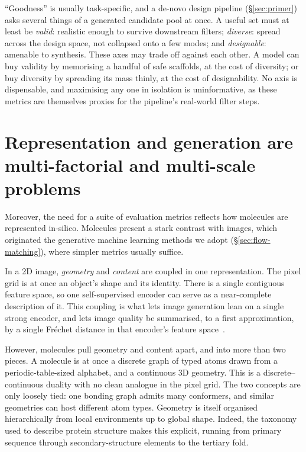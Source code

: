 \documentclass[12pt,a4paper,twoside]{report}
\begin{document}
``Goodness'' is usually task-specific, and a de-novo design pipeline (\S\ref{sec:primer}) asks several things of a generated candidate pool at once. A useful set must at least be \emph{valid}: realistic enough to survive downstream filters; \emph{diverse}: spread across the design space, not collapsed onto a few modes; and \emph{designable}: amenable to synthesis. These axes may trade off against each other. A model can buy validity by memorising a handful of safe scaffolds, at the cost of diversity; or buy diversity by spreading its mass thinly, at the cost of designability. No axis is dispensable, and maximising any one in isolation is uninformative, as these metrics are themselves proxies for the pipeline's real-world filter steps.

\section{Representation and generation are multi-factorial and multi-scale problems}
\label{sec:eval-multifactorial}


Moreover, the need for a suite of evaluation metrics reflects how molecules are represented in-silico. Molecules present a stark contrast with images, which originated the generative machine learning methods we adopt (\S\ref{sec:flow-matching}), where simpler metrics usually suffice.

In a 2D image, \emph{geometry} and \emph{content} are coupled in one representation. The pixel grid is at once an object's shape and its identity. There is a single contiguous feature space, so one self-supervised encoder can serve as a near-complete description of it. This coupling is what lets image generation lean on a single strong encoder, and lets image quality be summarised, to a first approximation, by a single Fr\'echet distance in that encoder's feature space~\cite{FID}.

However, molecules pull geometry and content apart, and into more than two pieces. A molecule is at once a discrete graph of typed atoms drawn from a periodic-table-sized alphabet, and a continuous 3D geometry. This is a discrete--continuous duality with no clean analogue in the pixel grid. The two concepts are only loosely tied: one bonding graph admits many conformers, and similar geometries can host different atom types. Geometry is itself organised hierarchically from local environments up to global shape. Indeed, the taxonomy used to describe protein structure makes this explicit, running from primary sequence through secondary-structure elements to the tertiary fold.
\end{document}
